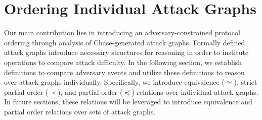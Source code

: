 \documentclass[runningheads]{llncs}
\theoremstyle{definition}
\newcommand{\squash}{\itemsep=0pt\parskip=0pt}
\begin{document}






\section{Ordering Individual Attack Graphs}

Our main contribution lies in introducing an adversary-constrained protocol ordering through analysis of Chase-generated attack graphs. Formally defined attack graphs introduce necessary structures for reasoning in order to institute operations to compare attack difficulty. In the following section, we establish definitions to compare adversary events and utilize these definitions to reason over attack graphs individually. Specifically, we introduce equivalence ($\simeq$), strict partial order ($\prec$), and partial order ($\preceq$) relations over individual attack graphs. In future sections, these relations will be leveraged to introduce equivalence and partial order relations over sets of attack graphs.
\end{document}

